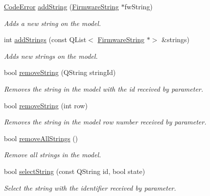 \begin{DoxyCompactItemize}
\mbox{\hyperlink{classContextualizationController_acb38587f7f9e610a5950956b345d69fd}{Code\+Error}} \mbox{\hyperlink{classContextualizationController_abb80030963c4abd056a200fefbf8b4e9}{add\+String}} (\mbox{\hyperlink{classFirmwareString}{Firmware\+String}} $\ast$fw\+String)
\begin{DoxyCompactList}\small\item\em Adds a new string on the model. \end{DoxyCompactList}\item 
int \mbox{\hyperlink{classContextualizationController_a4af8f49a57b9d9a7daf5b51d45620ed6}{add\+Strings}} (const Q\+List$<$ \mbox{\hyperlink{classFirmwareString}{Firmware\+String}} $\ast$$>$ \&strings)
\begin{DoxyCompactList}\small\item\em Adds new strings on the model. \end{DoxyCompactList}\item 
bool \mbox{\hyperlink{classContextualizationController_adedb36b408caff11f15632998e7b9413}{remove\+String}} (Q\+String string\+Id)
\begin{DoxyCompactList}\small\item\em Removes the string in the model with the id received by parameter. \end{DoxyCompactList}\item 
bool \mbox{\hyperlink{classContextualizationController_a0fb2ae8db12aba7888504f832bb63bd5}{remove\+String}} (int row)
\begin{DoxyCompactList}\small\item\em Removes the string in the model row number received by parameter. \end{DoxyCompactList}\item 
\mbox{\label{classContextualizationController_af9eb5f70f45cd3c501a8af97a4b280d4}} 
bool \mbox{\hyperlink{classContextualizationController_af9eb5f70f45cd3c501a8af97a4b280d4}{remove\+All\+Strings}} ()
\begin{DoxyCompactList}\small\item\em Remove all strings in the model. \end{DoxyCompactList}\item 
bool \mbox{\hyperlink{classContextualizationController_a943a8703d6e67fa5a08b4b8d73697dfc}{select\+String}} (const Q\+String id, bool state)
\begin{DoxyCompactList}\small\item\em Select the string with the identifier received by parameter. \end{DoxyCompactList}\item 
$$
\end{DoxyCompactItemize}
